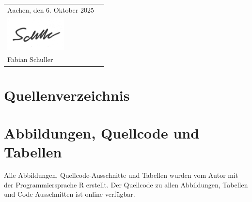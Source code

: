 \documentclass{article}
\numberwithin{equation}{subsection} %
\theoremstyle{mystyle}
\begin{document}
\noindent

\thispagestyle{empty}

\begin{tabularx}{\textwidth}{@{}lX@{}}
Aachen, den 6. Oktober 2025 
& 
\begin{flushright}

  \rule{6cm}{0.4pt} \\[-1.5cm] %
  \includegraphics[height=1.8cm]{images/unterschrift.png} \\
  Fabian Schuller
\end{flushright}

\end{tabularx}

\newpage

\tableofcontents
\newpage

















\section{Quellenverzeichnis}

\printbibliography

\section*{Abbildungen, Quellcode und Tabellen}
Alle Abbildungen, Quellcode-Ausschnitte und Tabellen wurden vom Autor mit der Programmiersprache R erstellt. Der Quellcode zu allen Abbildungen, Tabellen und Code-Ausschnitten ist online \cite{this_on_github} verfügbar.

\begin{appendices}


\end{appendices}
\end{document}
